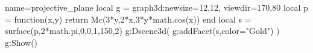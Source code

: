 \documentclass[10pt]{standalone}%
\begin{document}
\begin{luadraw}{name=projective_plane}
local g = graph3d:new{size={12,12}, viewdir={170,80}}
local p = function(x,y)
    return Mc(3*y,2*x,3*y*math.cos(x))
end
local s = surface(p,2*math.pi,0,0,1,{150,2})
g:Dscene3d( g:addFacet(s,{color="Gold"}) )
g:Show()
\end{luadraw}
\end{document}
